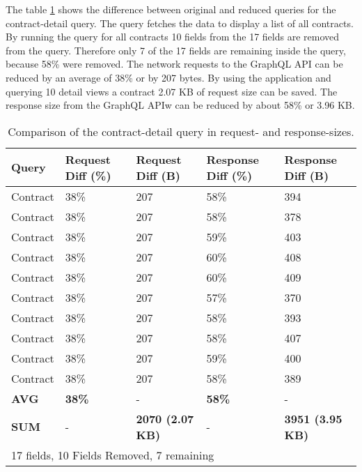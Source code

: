 \noindent The table \ref{table:code:comparison-contract-reduction} shows the difference between original and reduced queries for the contract-detail query. The query fetches the data to display a list of all contracts. By running the query for all contracts 10 fields from the 17 fields are removed from the query. Therefore only 7 of the 17 fields are remaining inside the query, because 58\% were removed. The network requests to the GraphQL \ac{API} can be reduced by an average of 38\% or by 207 bytes. By using the application and querying 10 detail views a contract 2.07 KB of request size can be saved. The response size from the GraphQL \ac{APIw} can be reduced by about 58\% or 3.96 KB.

\ifshowTables
\begin{table}[H]
  \begin{tabular}{|l|l|l|l|l|}
  \hline
  Query  & Request Diff (\%)  & Request Diff (B) & Response Diff (\%) & Response Diff (B)  \\
  \hline
  Contract & 38\% & 207 & 58\% & 394 \\
  \hline
  Contract & 38\% & 207 & 58\% & 378 \\
  \hline
  Contract & 38\% & 207 & 59\% & 403 \\
  \hline
  Contract & 38\% & 207 & 60\% & 408 \\
  \hline
  Contract & 38\% & 207 & 60\% & 409 \\
  \hline
  Contract & 38\% & 207 & 57\% & 370 \\
  \hline
  Contract & 38\% & 207 & 58\% & 393 \\
  \hline
  Contract & 38\% & 207 & 58\% & 407 \\
  \hline
  Contract & 38\% & 207 & 59\% & 400 \\
  \hline
  Contract & 38\% & 207 & 58\% & 389 \\
  \hline
  \hline
  \textbf{AVG} & \textbf{38\%} & - & \textbf{58\%} & - \\
  \hline
  \hline
  \textbf{SUM} & - & \textbf{2070 (2.07 KB)} & - & \textbf{3951 (3.95 KB)} \\
  \hline
  \multicolumn{5}{l}{17 fields, 10 Fields Removed, 7 remaining}
  \end{tabular}
  \caption{Comparison of the contract-detail query in request- and response-sizes.}\label{table:code:comparison-contract-reduction}
\end{table}
\fi